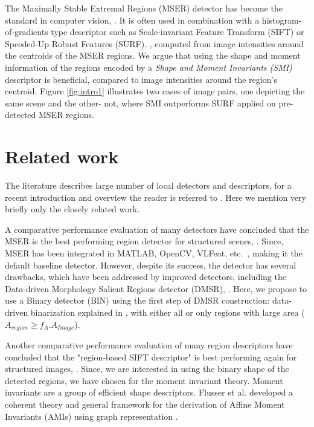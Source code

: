 \documentclass[a4paper,11pt]{article}
\begin{document}
The Maximally Stable Extremal Regions (MSER) detector has become the standard in computer vision, \cite{ Matas2002BMVC}. It is often used in combination with a histogram-of-gradients type descriptor such as Scale-invariant Feature Transform (SIFT) or Speeded-Up Robust Features (SURF), \cite{Bay2008}, computed from image intensities around the centroids of the MSER regions. We argue that using the shape and moment information of the  regions encoded by a {\em Shape and Moment Invariants (SMI)} descriptor is beneficial, compared to image intensities around the region's centroid. Figure \ref{fig:intro1} illustrates two cases of image pairs, one depicting the same scene and the other- not, where SMI outperforms SURF applied on pre-detected MSER regions.

\section{Related work}
The literature describes large number of local detectors and descriptors, for a recent introduction and overview the reader is referred to \cite{Hassaballah:2016}. Here we mention very briefly only the closely related work.

A comparative performance evaluation of many detectors have concluded that the MSER is the best performing region detector for structured scenes, \cite{Mikolajczyk:2005}. Since, MSER has been integrated in MATLAB, OpenCV, VLFeat, etc.~, making it the default baseline detector. However, despite its success, the detector has several drawbacks, which have been addressed by improved detectors, including the Data-driven Morphology Salient Regions detector (DMSR), \cite{Ranguelova2016AICCSA}. Here, we propose to use a Binary detector (BIN) using the first step of DMSR construction: data-driven binarization explained in \cite{Ranguelova2016AICCSA}, with either all or only regions with large area ($A_{region} \ge f_A.A_{Image}$).

Another comparative performance evaluation of many region descriptors have concluded that the "region-based SIFT descriptor" is best performing again for structured images, \cite{Mikolajczyk:descr:2005}. Since, we are interested in using the binary shape of the detected regions, we have chosen for the moment invariant theory. Moment invariants are a group of efficient shape descriptors. Flusser et al. developed a coherent theory and general framework for the derivation of Affine Moment Invariants (AMIs) using graph representation \cite{SukF04, Flusser09a}.
\end{document}
